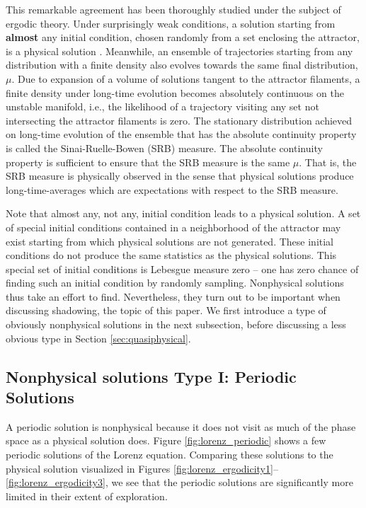 This remarkable agreement has been thoroughly studied under the subject
of ergodic theory. Under surprisingly weak conditions, a solution starting from
{\bf almost} any initial condition, chosen randomly from a set enclosing the attractor, is a physical solution \cite{young}.   
Meanwhile, an ensemble of trajectories starting from any distribution with a 
finite density also evolves towards the same final distribution, $\mu$. Due to expansion of a volume of solutions tangent to the attractor filaments, a finite density under long-time evolution becomes absolutely continuous on the unstable manifold, i.e., the likelihood of a trajectory visiting any set not intersecting the attractor filaments is zero. The 
stationary distribution achieved on long-time evolution of the ensemble that has the absolute continuity property is called the Sinai-Ruelle-Bowen
(SRB) measure. The absolute continuity property is sufficient to ensure that the SRB measure is the same $\mu.$ That is, the SRB measure is physically observed in the sense that physical solutions produce long-time-averages which are expectations with respect to the SRB measure. 

Note that almost any, not any, initial condition leads to a physical solution. A set of special initial conditions
contained in a neighborhood of the attractor may exist starting from which physical solutions are not generated. These initial conditions do not produce the same statistics as the physical solutions. This special set of initial conditions is Lebesgue measure zero -- one
has zero chance of finding such an initial condition by randomly sampling.
Nonphysical solutions thus take an effort to find.  Nevertheless, they
turn out to be important when discussing shadowing, the topic of this paper.
We first introduce a type of obviously nonphysical solutions in the next
subsection, before discussing a less obvious type in Section \ref{sec:quasiphysical}.

\subsection{Nonphysical solutions Type I: Periodic Solutions}

A periodic solution is nonphysical because it 
does not visit as much
of the phase space as a physical solution does.
Figure \ref{fig:lorenz_periodic} shows
a few periodic solutions of the Lorenz equation. Comparing these solutions
to the physical solution visualized in Figures \ref{fig:lorenz_ergodicity1}--\ref{fig:lorenz_ergodicity3},
we see that the periodic solutions are significantly more limited in their
extent of exploration.

